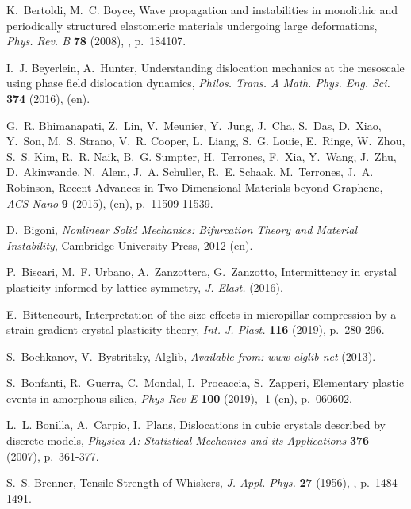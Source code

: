\documentclass[CRPHYS,Unicode,manuscript]{cedram}
\begin{document}
\begin{thebibliography}{100}
K.~Bertoldi, M.~C. Boyce, {\og Wave propagation and instabilities in monolithic
  and periodically structured elastomeric materials undergoing large
  deformations\fg}, \emph{Phys. Rev. B} \textbf{78} (2008), ,
  p.~184107.

I.~J. Beyerlein, A.~Hunter, {\og Understanding dislocation mechanics at the
  mesoscale using phase field dislocation dynamics\fg}, \emph{Philos. Trans. A
  Math. Phys. Eng. Sci.} \textbf{374} (2016),  (en).

G.~R. Bhimanapati, Z.~Lin, V.~Meunier, Y.~Jung, J.~Cha, S.~Das, D.~Xiao,
  Y.~Son, M.~S. Strano, V.~R. Cooper, L.~Liang, S.~G. Louie, E.~Ringe, W.~Zhou,
  S.~S. Kim, R.~R. Naik, B.~G. Sumpter, H.~Terrones, F.~Xia, Y.~Wang, J.~Zhu,
  D.~Akinwande, N.~Alem, J.~A. Schuller, R.~E. Schaak, M.~Terrones, J.~A.
  Robinson, {\og Recent Advances in {Two-Dimensional} Materials beyond
  Graphene\fg}, \emph{ACS Nano} \textbf{9} (2015),  (en),
  p.~11509-11539.

D.~Bigoni, \emph{Nonlinear Solid Mechanics: Bifurcation Theory and Material
  Instability}, Cambridge University Press, 2012 (en).

P.~Biscari, M.~F. Urbano, A.~Zanzottera, G.~Zanzotto, {\og Intermittency in
  crystal plasticity informed by lattice symmetry\fg}, \emph{J. Elast.} (2016).

E.~Bittencourt, {\og Interpretation of the size effects in micropillar
  compression by a strain gradient crystal plasticity theory\fg}, \emph{Int. J.
  Plast.} \textbf{116} (2019), p.~280-296.

S.~Bochkanov, V.~Bystritsky, {\og Alglib\fg}, \emph{Available from: www alglib
  net} (2013).

S.~Bonfanti, R.~Guerra, C.~Mondal, I.~Procaccia, S.~Zapperi, {\og Elementary
  plastic events in amorphous silica\fg}, \emph{Phys Rev E} \textbf{100}
  (2019), -1 (en), p.~060602.

L.~L. Bonilla, A.~Carpio, I.~Plans, {\og Dislocations in cubic crystals
  described by discrete models\fg}, \emph{Physica A: Statistical Mechanics and
  its Applications} \textbf{376} (2007), p.~361-377.

S.~S. Brenner, {\og Tensile Strength of Whiskers\fg}, \emph{J. Appl. Phys.}
  \textbf{27} (1956), , p.~1484-1491.


\end{thebibliography}
\end{document}
